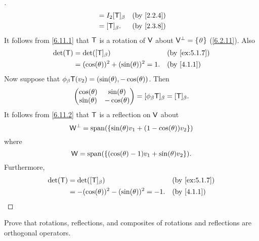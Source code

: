 \begin{proof}[]
\begin{align*}
                                    & = I_2 [\T]_{\beta}                    &  & \by{2.2.4} \\
                                    & = [\T]_{\beta}.                       &  & \by{2.3.8}
  \end{align*}
  It follows from \cref{6.11.1} that \(\mathsf{T}\) is a rotation of \(\mathsf{V}\) about \(\mathsf{V}^{\perp} = \left\lbrace\mathit{0}\right\rbrace\) (\cref{6.2.11}).
  Also
  \begin{align*}
    \det(\T) & = \det([\T]_{\beta})                       &  & \by{ex:5.1.7} \\
             & = (\cos(\theta))^2 + (\sin(\theta))^2 = 1. &  & \by{4.1.1}
  \end{align*}
  Now suppose that \(\phi_{\beta} \mathsf{T}(v_2) = (\sin(\theta), -\cos(\theta))\).
  Then
  \[
    \begin{pmatrix}
      \cos(\theta) & \sin(\theta)  \\
      \sin(\theta) & -\cos(\theta)
    \end{pmatrix} = [\phi_{\beta} \mathsf{T}]_{\beta} = [\mathsf{T}]_{\beta}.
  \]
  It follows from \cref{6.11.2} that \(\mathsf{T}\) is a reflection on \(\mathsf{V}\) about
  \[
    \W^{\perp} = \spn{\set{\sin(\theta) v_1 + (1 - \cos(\theta)) v_2}}
  \]
  where
  \[
    \W = \spn{\set{(\cos(\theta) - 1) v_1 + \sin(\theta) v_2}}.
  \]
  Furthermore,
  \begin{align*}
    \det(\T) & = \det([\T]_{\beta})                          &  & \by{ex:5.1.7} \\
             & = - (\cos(\theta))^2 - (\sin(\theta))^2 = -1. &  & \by{4.1.1}
  \end{align*}
\end{proof}

\exercisesection

\setcounter{ex}{1}
\begin{ex}\label{ex:6.11.2}
  Prove that rotations, reflections, and composites of rotations and reflections are orthogonal operators.
\end{ex}

